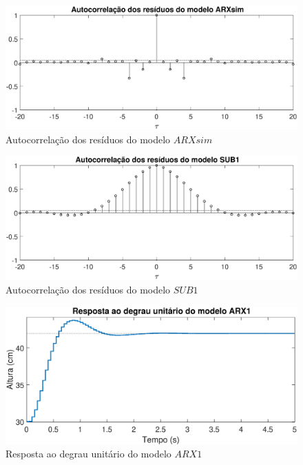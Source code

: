 \begin{figure}[H]
	\centering
	\includegraphics[width=1\linewidth]{autocorrelacaoARXsim}
	\caption[Autocorrelação dos resíduos do modelo $ARXsim$]{Autocorrelação dos resíduos do modelo $ARXsim$}
	\label{fig:autocorrelacaoarxsim}
\end{figure}

\begin{figure}[H]
	\centering
	\includegraphics[width=1\linewidth]{autocorrelacaosub1}
	\caption[Autocorrelação dos resíduos do modelo $SUB1$]{Autocorrelação dos resíduos do modelo $SUB1$}
	\label{fig:autocorrelacaosub1}
\end{figure}

\begin{figure}[H]
	\centering
	\includegraphics[width=1\linewidth]{respostadegrauarx1}
	\caption[Resposta ao degrau do modelo $ARX1$]{Resposta ao degrau unitário do modelo $ARX1$}
	\label{fig:respostadegrauarx1}
\end{figure}

